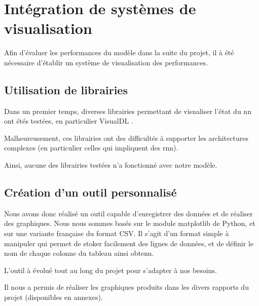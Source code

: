 \section{Intégration de systèmes de visualisation}\label{sec:gmsnn_track}
Afin d'évaluer les performances du modèle dans la suite du projet, il à été nécessaire d'établir un système de visualisation des performances.

\subsection{Utilisation de librairies}
Dans un premier temps, diverses librairies permettant de visualiser l'état du \gls{nn} ont étés testées, en particulier VisualDL \autocite{VisualDLGit,VisualDLSite}.

Malheureusement, ces librairies ont des difficultés à supporter les architectures complexes (en particulier celles qui impliquent des \gls{rnn}).

Ainsi, aucune des librairies testées n'a fonctionné avec notre modèle.

\subsection{Création d'un outil personnalisé}
Nous avons donc réalisé un outil capable d'enregistrer des données et de réaliser des graphiques. Nous nous sommes basés sur le module \og matplotlib\fg{} de Python, et sur une variante française du format CSV. Il s'agit d'un format simple à manipuler qui permet de stoker facilement des lignes de données, et de définir le nom de chaque colonne du tableau ainsi obtenu.

L'outil à évolué tout au long du projet pour s'adapter à nos besoins.

Il nous a permis de réaliser les graphiques produits dans les divers rapports du projet (disponibles en annexes).

